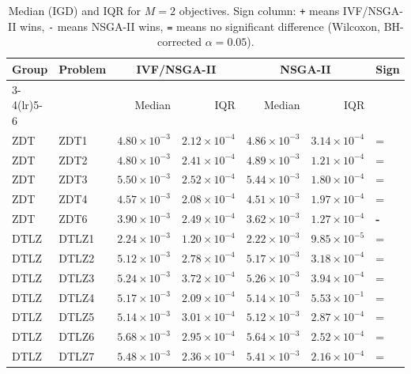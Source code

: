 \begin{table}[t]
\centering
\caption{Median (IGD) and IQR for $M=2$ objectives. Sign column: \texttt{+} means IVF/NSGA-II wins, \texttt{-} means NSGA-II wins, \texttt{=} means no significant difference (Wilcoxon, BH-corrected $\alpha=0.05$).}
\label{tab:igd_m2_ivfnsgaii}
\scriptsize
\begin{tabular}{llrrrrl}
\toprule
Group & Problem & \multicolumn{2}{c}{IVF/NSGA-II} & \multicolumn{2}{c}{NSGA-II} & Sign \\
\cmidrule(lr){3-4}\cmidrule(lr){5-6}
 & & Median & IQR & Median & IQR & \\
\midrule
ZDT & ZDT1 & $4.80\!\times\!10^{-3}$ & $2.12\!\times\!10^{-4}$ & $4.86\!\times\!10^{-3}$ & $3.14\!\times\!10^{-4}$ & = \\
ZDT & ZDT2 & $4.80\!\times\!10^{-3}$ & $2.41\!\times\!10^{-4}$ & $4.89\!\times\!10^{-3}$ & $1.21\!\times\!10^{-4}$ & = \\
ZDT & ZDT3 & $5.50\!\times\!10^{-3}$ & $2.52\!\times\!10^{-4}$ & $5.44\!\times\!10^{-3}$ & $1.80\!\times\!10^{-4}$ & = \\
ZDT & ZDT4 & $4.57\!\times\!10^{-3}$ & $2.08\!\times\!10^{-4}$ & $4.51\!\times\!10^{-3}$ & $1.97\!\times\!10^{-4}$ & = \\
ZDT & ZDT6 & $3.90\!\times\!10^{-3}$ & $2.49\!\times\!10^{-4}$ & $3.62\!\times\!10^{-3}$ & $1.27\!\times\!10^{-4}$ & \textbf{-} \\
\addlinespace
DTLZ & DTLZ1 & $2.24\!\times\!10^{-3}$ & $1.20\!\times\!10^{-4}$ & $2.22\!\times\!10^{-3}$ & $9.85\!\times\!10^{-5}$ & = \\
DTLZ & DTLZ2 & $5.12\!\times\!10^{-3}$ & $2.78\!\times\!10^{-4}$ & $5.17\!\times\!10^{-3}$ & $3.18\!\times\!10^{-4}$ & = \\
DTLZ & DTLZ3 & $5.24\!\times\!10^{-3}$ & $3.72\!\times\!10^{-4}$ & $5.26\!\times\!10^{-3}$ & $3.94\!\times\!10^{-4}$ & = \\
DTLZ & DTLZ4 & $5.17\!\times\!10^{-3}$ & $2.09\!\times\!10^{-4}$ & $5.14\!\times\!10^{-3}$ & $5.53\!\times\!10^{-1}$ & = \\
DTLZ & DTLZ5 & $5.14\!\times\!10^{-3}$ & $3.01\!\times\!10^{-4}$ & $5.12\!\times\!10^{-3}$ & $2.87\!\times\!10^{-4}$ & = \\
DTLZ & DTLZ6 & $5.68\!\times\!10^{-3}$ & $2.95\!\times\!10^{-4}$ & $5.64\!\times\!10^{-3}$ & $2.52\!\times\!10^{-4}$ & = \\
DTLZ & DTLZ7 & $5.48\!\times\!10^{-3}$ & $2.36\!\times\!10^{-4}$ & $5.41\!\times\!10^{-3}$ & $2.16\!\times\!10^{-4}$ & = \\

\end{tabular}
\end{table}
